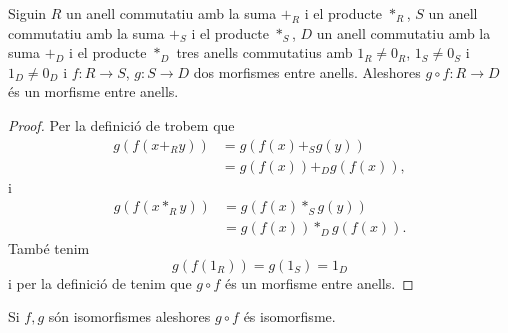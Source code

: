 \documentclass[../Apunts.tex]{subfiles}
\begin{document}
	\begin{proposition}
		\label{prop:operació morfismes entre anells és morfisme entre anells}
		Siguin \(R\) un anell commutatiu amb la suma \(+_{R}\) i el producte \(\ast_{R}\), \(S\) un anell commutatiu amb la suma \(+_{S}\) i el producte \(\ast_{S}\), \(D\) un anell commutatiu amb la suma \(+_{D}\) i el producte \(\ast_{D}\) tres anells commutatius amb \(1_{R}\neq0_{R}\), \(1_{S}\neq0_{S}\) i \(1_{D}\neq0_{D}\) i \(f\colon R\longrightarrow S\), \(g\colon S\longrightarrow D\) dos morfismes entre anells.
		Aleshores \(g\circ f\colon R\longrightarrow D\) és un morfisme entre anells.
		\begin{proof}
			Per la definició de  trobem que
			\begin{align*}
			g(f(x+_{R}y))&=g(f(x)+_{S}g(y))\\
			&=g(f(x))+_{D}g(f(x)),
			\end{align*}
			i
			\begin{align*}
			g(f(x\ast_{R}y))&=g(f(x)\ast_{S}g(y))\\
			&=g(f(x))\ast_{D}g(f(x)).
			\end{align*}
			També tenim
			\[g(f(1_{R}))=g(1_{S})=1_{D}\]
			i per la definició de  tenim que \(g\circ f\) és un morfisme entre anells.
		\end{proof}
	\end{proposition}
	\begin{corollary}
		\label{corollary:conjugació isomorfismes enre anells és isomorfisme entre anells}
		Si \(f,g\) són isomorfismes aleshores \(g\circ f\) és isomorfisme.
	\end{corollary}
\end{document}
